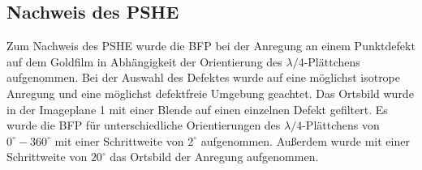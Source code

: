 \documentclass[titlepage]{article}
\begin{document}
	
	
	\subsection{Nachweis des PSHE}
	Zum Nachweis des PSHE wurde die BFP bei der Anregung an einem Punktdefekt auf dem Goldfilm in Abhängigkeit der Orientierung des $\lambda /4$-Plättchens aufgenommen. Bei der Auswahl des Defektes wurde auf eine möglichst isotrope Anregung und eine möglichst defektfreie Umgebung geachtet. Das Ortsbild wurde in der Imageplane 1 mit einer Blende auf einen einzelnen Defekt gefiltert. Es wurde die BFP für unterschiedliche Orientierungen des $\lambda/4$-Plättchens von $0^\circ-360^\circ$ mit einer Schrittweite von $2^\circ$ aufgenommen. Außerdem wurde mit einer Schrittweite von $20^\circ$ das Ortsbild der Anregung aufgenommen.
	
\end{document}
